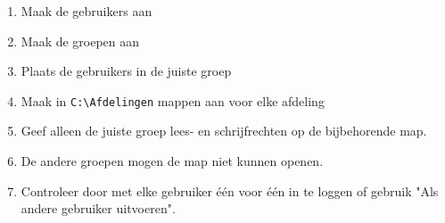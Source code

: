 \begin{enumerate}
\item Maak de gebruikers aan
\item Maak de groepen aan
\item Plaats de gebruikers in de juiste groep
\item Maak in \verb|C:\Afdelingen| mappen aan voor elke afdeling
\item Geef alleen de juiste groep lees- en schrijfrechten op de bijbehorende map.
\item De andere groepen mogen de map niet kunnen openen.
\item Controleer door met elke gebruiker \'e\'en voor \'e\'en in te loggen of gebruik "Als andere gebruiker uitvoeren".
\end{enumerate}

